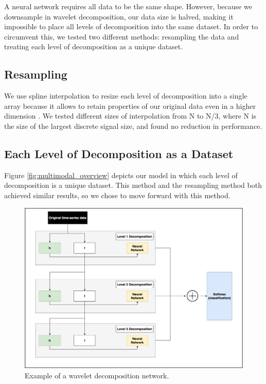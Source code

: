 \documentclass{turabian-thesis}
\begin{document}
A neural network requires all data to be the same shape. However, because we downsample in wavelet decomposition, our data size is halved, making it impossible to place all levels of decomposition into the same dataset. In order to circumvent this, we tested two different methods: resampling the data and treating each level of decomposition as a unique dataset.


\subsection{Resampling}

We use spline interpolation to resize each level of decomposition into a single array because it allows to retain properties of our original data even in a higher dimension \cite{gregory_shape_1985}. We tested different sizes of interpolation from N to N/3, where N is the size of the largest discrete signal size, and found no reduction in performance.
 
\subsection{Each Level of Decomposition as a Dataset}
Figure \ref{fig:multimodal_overview} depicts our model in which each level of decomposition is a unique dataset. This method and the resampling method both achieved similar results, so we chose to move forward with this method.



\begin{figure}[h!]
   \begin{center}
      \includegraphics[scale=0.35]{../media/wavelet_decomp.png}
   \end{center}
   \caption{Example of a wavelet decomposition network.}
   \label{fig:wavelet_decomp}
\end{figure}
\end{document}
